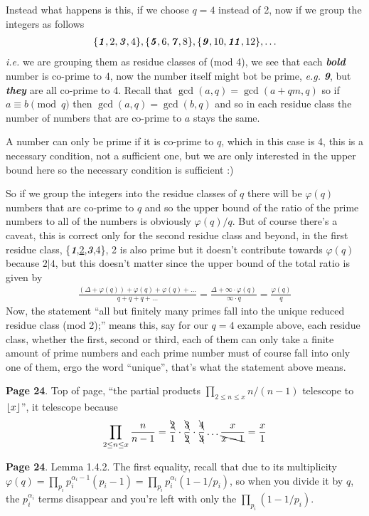 \documentclass[aps,preprint,preprintnumbers,nofootinbib,showpacs,prd]{revtex4-1}
\newcommand{\ie}{{\it i.e.} }
\newcommand{\eg}{{\it e.g.} }
\newcommand{\nbea}{\begin{eqnarray*}}
\newcommand{\neea}{\end{eqnarray*}}
\DeclarePairedDelimiter{\floor}{\lfloor}{\rfloor}
\begin{document}
Instead what happens is this, if we choose $q=4$ instead of 2, now if we group the integers as follows
%
\nbea
\{\textbf{\textit 1},2,\textbf{\textit 3},4\},\{\textbf{\textit 5},6,\textbf{\textit {7}},8\},\{\textbf{\textit 9},10,\textbf{\textit {11}},12\}, \dots
\neea
%
\ie we are grouping them as residue classes of (mod 4), we see that each \textbf{\textit{bold}} number is co-prime to 4, now the number itself might bot be prime, \eg \textbf{\textit{9}}, but \textbf{\textit{they}} are all co-prime to 4. Recall that $\gcd(a, q) = \gcd(a + qm, q)$ so if $a \equiv b \pmod{q}$ then $\gcd(a,q) = \gcd(b,q)$ and so in each residue class the number of numbers that are co-prime to $a$ stays the same.

A number can only be prime if it is co-prime to $q$, which in this case is 4, this is a necessary condition, not a sufficient one, but we are only interested in the upper bound here so the necessary condition is sufficient :)

So if we group the integers into the residue classes of $q$ there will be $\varphi(q)$ numbers that are co-prime to $q$ and so the upper bound of the ratio of the prime numbers to all of the numbers is obviously $\varphi(q)/q$. But of course there's a caveat, this is correct only for the second residue class and beyond, in the first residue class, \{\textbf{\textit 1},\underline{2},\textbf{\textit 3},4\}, 2 is also prime but it doesn't contribute towards $\varphi(q)$ because $2|4$, but this doesn't matter since the upper bound of the total ratio is given by
%
\nbea
\frac{(\Delta + \varphi(q)) + \varphi(q) + \varphi(q) + \dots }{q + q + q + \dots} = \frac{\Delta + \infty\cdot \varphi(q)}{\infty \cdot q} = \frac{\varphi(q)}{q}
\neea
%
Now, the statement ``all but finitely many primes fall into the unique reduced residue class (mod 2);'' means this, say for our $q=4$ example above, each residue class, whether the first, second or third, each of them can only take a finite amount of prime numbers and each prime number must of course fall into only one of them, ergo the word ``unique'', that's what the statement above means.

{\bf Page 24}. Top of page, ``the partial products $\prod_{2\le n\le x} n/(n-1)$ telescope to $\floor{x}$'', it telescope because
%
\nbea
\prod_{2\le n\le x} \frac{n}{n-1} = \frac{\bcancel{2}}{1}\cdot\frac{\bcancel{3}}{\bcancel{2}}\cdot\frac{\bcancel{4}}{\bcancel{3}} \dots \frac{x}{\bcancel{x-1}} = \frac{x}{1}
\neea
%

{\bf Page 24}. Lemma 1.4.2. The first equality, recall that due to its multiplicity $\varphi(q) = \prod_{p_i} p_i^{\alpha_i - 1}( p_i -1) = \prod_{p_i} p_i^{\alpha_i }( 1 -1/p_i)$, so when you divide it by $q$, the $p_i^{\alpha_i }$ terms disappear and you're left with only the $\prod_{p_i} ( 1 -1/p_i)$.
\end{document}
